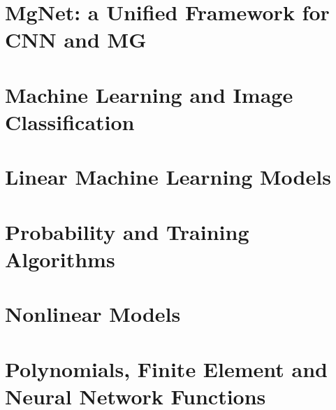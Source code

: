 





%







\chapter{MgNet: a Unified Framework for CNN and MG}







\chapter{Machine Learning and Image Classification} 



\chapter{Linear Machine Learning Models}



%



\chapter{Probability and Training Algorithms}



%


%
%


\chapter{Nonlinear Models}

%


\chapter{Polynomials, Finite Element and Neural Network Functions}









